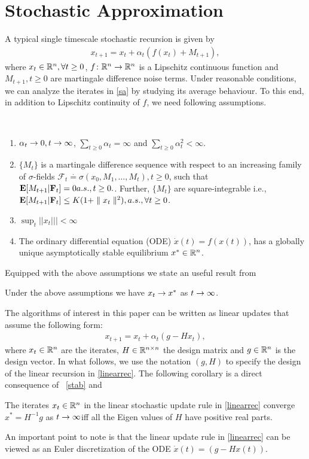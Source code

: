 \section{Stochastic Approximation}
A typical single timescale stochastic recursion is given by 
\begin{align}\label{sa}
x_{t+1}=x_t+\alpha_t(f(x_t)+M_{t+1}),
\end{align}
where $x_t\in \mathbb{R}^n, \forall t\geq 0$, $f\colon \mathbb{R}^n \rightarrow \mathbb{R}^n$ is a Lipschitz continuous function and $M_{t+1}, t\geq 0$ are martingale difference noise terms. Under reasonable conditions, we can analyze the iterates in \eqref{sa} by studying its average behaviour. To this end, in addition to Lipschitz continuity of $f$,  we need following assumptions.\par
\begin{assumption}\label{saassump}\hspace{10pt}\\
\vspace{-20pt}
\begin{enumerate}[leftmargin=*]
\item $\alpha_t\rightarrow 0, t\rightarrow\infty$, $\sum_{t\geq 0}\alpha_t =\infty$ and $\sum_{t\geq 0}\alpha^2_t <\infty$.
\item $\{M_t\}$ is a martingale difference sequence with respect to an increasing family of $\sigma$-fields $\mathcal{F}_t\stackrel{\cdot}{=}\sigma(x_0,M_1,\ldots,M_t),t\geq 0$, such that
$
\mathbf{E}[M_{t+1}|\mathbf{F}_t]=0 a.s., t\geq 0.
$. Further, $\{M_t\}$ are square-integrable i.e., $\mathbf{E}[M_{t+1}|\mathbf{F}_t]\leq K(1+\parallel x_t\parallel^2), a.s., \forall t\geq 0$.
\item $\sup_t||x_t|||<\infty$
\item\label{stab} The ordinary differential equation (ODE) $\dot{x}(t)=f(x(t))$, has a globally unique asymptotically stable equilibrium $x^*\in \mathbb{R}^n$.
\end{enumerate}\end{assumption}
Equipped with the above assumptions we state an useful result from \cite{}
\begin{theorem}\label{sat}
Under the above assumptions we have $x_t\rightarrow x^*$ as $t\rightarrow\infty$. 
\end{theorem}
The algorithms of interest in this paper can be written as linear updates that assume the following form:
\begin{align}\label{linearrec}
x_{t+1}=x_t+\alpha_t(g-Hx_t),
\end{align}
where $x_t\in \mathbb{R}^n$ are the iterates, $H\in \mathbb{R}^{n\times n}$ the design matrix and $g\in \mathbb{R}^n$ is the design vector. In what follows, we use the notation $(g,H)$ to specify the design of the linear recursion in \eqref{linearrec}.
The following corollary is a direct consequence of ~\ref{stab} and 
\begin{corollary}\label{linstab}
The iterates $x_t\in \mathbb{R}^n$ in the linear stochastic update rule in \eqref{linearrec} converge $x^*=H^{-1}g$ as $t\rightarrow\infty $iff all the Eigen values of $H$ have positive real parts.
\end{corollary}
An important point to note is that the linear update rule in \eqref{linearrec} can be viewed as an Euler discretization of the ODE $\dot{x}(t)=(g-Hx(t))$.
